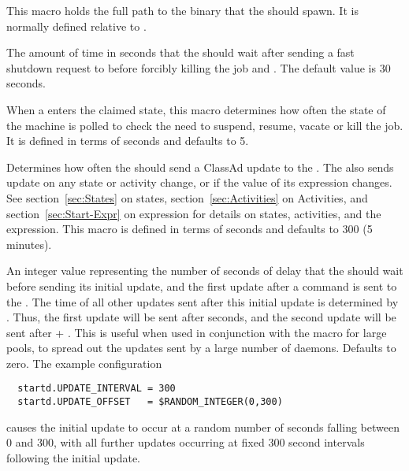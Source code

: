\begin{description}

\label{param:Starter}
\item[\Macro{STARTER}]
  This macro holds the
  full path to the  binary that the  should 
  spawn.
  It is normally defined relative to .
  
\label{param:KillingTimeout}
\item[\Macro{KILLING\_TIMEOUT}]
  The amount of time in seconds that the  should wait after 
  sending a fast shutdown request to  before forcibly killing the job and .  
  The default value is 30 seconds. 

\label{param:PollingInterval}
\item[\Macro{POLLING\_INTERVAL}]
  When a
   enters the claimed state, this macro determines how often
  the state of the machine is polled to check the need to suspend, resume,
  vacate or kill the job.  It is defined in terms of seconds and defaults to
  5.
  
\label{param:UpdateInterval}
\item[\Macro{UPDATE\_INTERVAL}]
  Determines how often the  should send a ClassAd update
  to the .  The  also sends update on any
  state or activity change, or if the value of its  expression
  changes.  See section~\ref{sec:States} on 
  states, section~\ref{sec:Activities} on 
  Activities, and section~\ref{sec:Start-Expr} on 
   expression for details on states, activities, and the
   expression.  This macro is defined in
  terms of seconds and defaults to 300 (5 minutes).
  
\label{param:UpdateOffset}
\item[\Macro{UPDATE\_OFFSET}]
  An integer value representing the number of seconds of delay 
  that the  should wait
  before sending its initial update, and the first update after a
   command is sent to the .
  The time of all other updates sent after this initial update
  is determined by .
  Thus, the first update will be sent after
   seconds, and the second update will be sent after
   + .
  This is useful when used in conjunction
  with the  macro for large pools,
  to spread out the updates
  sent by a large number of  daemons.
  Defaults to zero.
  The example configuration
  \footnotesize
  \begin{verbatim}
  startd.UPDATE_INTERVAL = 300
  startd.UPDATE_OFFSET   = $RANDOM_INTEGER(0,300)
  \end{verbatim}
  \normalsize
  causes the initial update to occur at a random number of seconds
  falling between 0 and 300,
  with all further updates occurring at fixed 300
  second intervals following the initial update.


\end{description}
